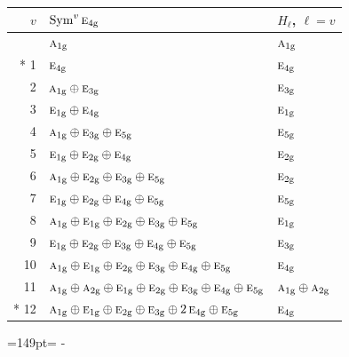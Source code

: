 \documentclass[10pt,a4paper]{article}
\newcommand{\needspace}[1]{\par\penalty-100\begingroup\dimen0=#1\relax\dimen2=\pagegoal
  \advance\dimen2-\pagetotal\ifdim\dimen0>\dimen2\relax\ifdim\dimen2>0pt\vfil\break\fi\fi
  \endgroup}
\numberwithin{equation}{section}
\newcommand{\irr}[1]{\text{\normalfont\scshape #1}}
\newcommand{\ptag}[1]{\mathrm{#1}}
\begin{document}
{\small\begin{longtable}{@{}rll@{}}\toprule
$v$ & $\operatorname{Sym}^{v}\irr{e}_{4\ptag{g}}$ & $H_\ell$, $\ell = v$\\\midrule\endhead
\bottomrule\endfoot\endlastfoot
0 & $\irr{a}_{1\ptag{g}}$ & $\irr{a}_{1\ptag{g}}$\\*
1 & $\irr{e}_{4\ptag{g}}$ & $\irr{e}_{4\ptag{g}}$\\
2 & $\irr{a}_{1\ptag{g}} \oplus \irr{e}_{3\ptag{g}}$ & $\irr{e}_{3\ptag{g}}$\\
3 & $\irr{e}_{1\ptag{g}} \oplus \irr{e}_{4\ptag{g}}$ & $\irr{e}_{1\ptag{g}}$\\
4 & $\irr{a}_{1\ptag{g}} \oplus \irr{e}_{3\ptag{g}} \oplus \irr{e}_{5\ptag{g}}$ & $\irr{e}_{5\ptag{g}}$\\
5 & $\irr{e}_{1\ptag{g}} \oplus \irr{e}_{2\ptag{g}} \oplus \irr{e}_{4\ptag{g}}$ & $\irr{e}_{2\ptag{g}}$\\
6 & $\irr{a}_{1\ptag{g}} \oplus \irr{e}_{2\ptag{g}} \oplus \irr{e}_{3\ptag{g}} \oplus \irr{e}_{5\ptag{g}}$ & $\irr{e}_{2\ptag{g}}$\\
7 & $\irr{e}_{1\ptag{g}} \oplus \irr{e}_{2\ptag{g}} \oplus \irr{e}_{4\ptag{g}} \oplus \irr{e}_{5\ptag{g}}$ & $\irr{e}_{5\ptag{g}}$\\
8 & $\irr{a}_{1\ptag{g}} \oplus \irr{e}_{1\ptag{g}} \oplus \irr{e}_{2\ptag{g}} \oplus \irr{e}_{3\ptag{g}} \oplus \irr{e}_{5\ptag{g}}$ & $\irr{e}_{1\ptag{g}}$\\
9 & $\irr{e}_{1\ptag{g}} \oplus \irr{e}_{2\ptag{g}} \oplus \irr{e}_{3\ptag{g}} \oplus \irr{e}_{4\ptag{g}} \oplus \irr{e}_{5\ptag{g}}$ & $\irr{e}_{3\ptag{g}}$\\
10 & $\irr{a}_{1\ptag{g}} \oplus \irr{e}_{1\ptag{g}} \oplus \irr{e}_{2\ptag{g}} \oplus \irr{e}_{3\ptag{g}} \oplus \irr{e}_{4\ptag{g}} \oplus \irr{e}_{5\ptag{g}}$ & $\irr{e}_{4\ptag{g}}$\\
11 & $\irr{a}_{1\ptag{g}} \oplus \irr{a}_{2\ptag{g}} \oplus \irr{e}_{1\ptag{g}} \oplus \irr{e}_{2\ptag{g}} \oplus \irr{e}_{3\ptag{g}} \oplus \irr{e}_{4\ptag{g}} \oplus \irr{e}_{5\ptag{g}}$ & $\irr{a}_{1\ptag{g}} \oplus \irr{a}_{2\ptag{g}}$\\*
12 & $\irr{a}_{1\ptag{g}} \oplus \irr{e}_{1\ptag{g}} \oplus \irr{e}_{2\ptag{g}} \oplus \irr{e}_{3\ptag{g}} \oplus 2\,\irr{e}_{4\ptag{g}} \oplus \irr{e}_{5\ptag{g}}$ & $\irr{e}_{4\ptag{g}}$\\
\bottomrule\end{longtable}}
\needspace{149pt}
\end{document}
